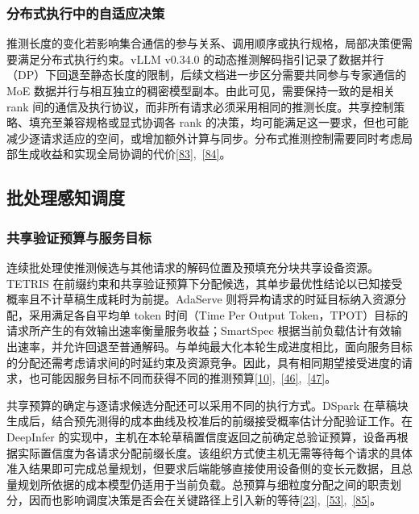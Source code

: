 \documentclass[11pt,a4paper,UTF8,fontset=none,scheme=plain,zihao=-4]{ctexart}
\begin{document}
\hypertarget{section-6-1-4}{%
\subsubsection{分布式执行中的自适应决策}\label{section-6-1-4}}

推测长度的变化若影响集合通信的参与关系、调用顺序或执行规格，局部决策便需要满足分布式执行约束。vLLM
v0.34.0
的动态推测解码指引记录了数据并行（DP）下回退至静态长度的限制，后续文档进一步区分需要共同参与专家通信的
MoE 数据并行与相互独立的稠密模型副本。由此可见，需要保持一致的是相关
rank
间的通信及执行协议，而非所有请求必须采用相同的推测长度。共享控制策略、填充至兼容规格或显式协调各
rank
的决策，均可能满足这一要求，但也可能减少逐请求适应的空间，或增加额外计算与同步。分布式推测控制需要同时考虑局部生成收益和实现全局协调的代价\protect\hyperlink{ref-vllmdynamic034}{{[}83{]}},~\protect\hyperlink{ref-vllmdynamiclatest}{{[}84{]}}。

\hypertarget{section-6-2}{%
\subsection{批处理感知调度}\label{section-6-2}}

\hypertarget{section-6-2-1}{%
\subsubsection{共享验证预算与服务目标}\label{section-6-2-1}}

连续批处理使推测候选与其他请求的解码位置及预填充分块共享设备资源。TETRIS
在前缀约束和共享验证预算下分配候选，其单步最优性结论以已知接受概率且不计草稿生成耗时为前提。AdaServe
则将异构请求的时延目标纳入资源分配，采用满足各自平均单 token 时间（Time
Per Output
Token，TPOT）目标的请求所产生的有效输出速率衡量服务收益；SmartSpec
根据当前负载估计有效输出速率，并允许回退至普通解码。与单纯最大化本轮生成进度相比，面向服务目标的分配还需考虑请求间的时延约束及资源竞争。因此，具有相同期望接受进度的请求，也可能因服务目标不同而获得不同的推测预算\protect\hyperlink{ref-smartspec}{{[}10{]}},~\protect\hyperlink{ref-tetris}{{[}46{]}},~\protect\hyperlink{ref-adaserve}{{[}47{]}}。

共享预算的确定与逐请求候选分配还可以采用不同的执行方式。DSpark
在草稿块生成后，结合预先测得的成本曲线及校准后的前缀接受概率估计分配验证工作。在
DeepInfer
的实现中，主机在本轮草稿置信度返回之前确定总验证预算，设备再根据实际置信度为各请求分配前缀长度。该组织方式使主机无需等待每个请求的具体准入结果即可完成总量规划，但要求后端能够直接使用设备侧的变长元数据，且总量规划所依据的成本模型仍适用于当前负载。总预算与细粒度分配之间的职责划分，因而也影响调度决策是否会在关键路径上引入新的等待\protect\hyperlink{ref-dspark}{{[}23{]}},~\protect\hyperlink{ref-avdocs}{{[}53{]}},~\protect\hyperlink{ref-deepinferdocs}{{[}85{]}}。
\end{document}
